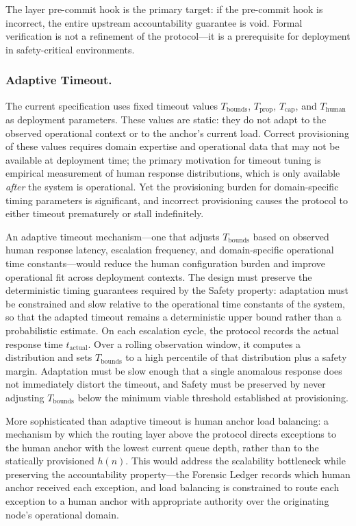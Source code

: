 The \fact{} layer pre-commit hook is the primary target: if the pre-commit hook is incorrect, the entire upstream accountability guarantee is void. Formal verification is not a refinement of the protocol---it is a prerequisite for deployment in safety-critical environments.

\subsubsection{Adaptive Timeout.}
The current specification uses fixed timeout values $T_{\mathrm{bounds}}$, $T_{\mathrm{prop}}$, $T_{\mathrm{cap}}$, and $T_{\mathrm{human}}$ as deployment parameters. These values are static: they do not adapt to the observed operational context or to the anchor's current load. Correct provisioning of these values requires domain expertise and operational data that may not be available at deployment time; the primary motivation for timeout tuning is empirical measurement of human response distributions, which is only available \emph{after} the system is operational. Yet the provisioning burden for domain-specific timing parameters is significant, and incorrect provisioning causes the protocol to either timeout prematurely or stall indefinitely.

An adaptive timeout mechanism---one that adjusts $T_{\mathrm{bounds}}$ based on observed human response latency, escalation frequency, and domain-specific operational time constants---would reduce the human configuration burden and improve operational fit across deployment contexts. The design must preserve the deterministic timing guarantees required by the Safety property: adaptation must be constrained and slow relative to the operational time constants of the system, so that the adapted timeout remains a deterministic upper bound rather than a probabilistic estimate. On each escalation cycle, the protocol records the actual response time $t_{\mathrm{actual}}$. Over a rolling observation window, it computes a distribution and sets $T_{\mathrm{bounds}}$ to a high percentile of that distribution plus a safety margin. Adaptation must be slow enough that a single anomalous response does not immediately distort the timeout, and Safety must be preserved by never adjusting $T_{\mathrm{bounds}}$ below the minimum viable threshold established at provisioning.

More sophisticated than adaptive timeout is human anchor load balancing: a mechanism by which the routing layer above the protocol directs exceptions to the human anchor with the lowest current queue depth, rather than to the statically provisioned $h(n)$. This would address the scalability bottleneck while preserving the accountability property---the Forensic Ledger records which human anchor received each exception, and load balancing is constrained to route each exception to a human anchor with appropriate authority over the originating node's operational domain.

